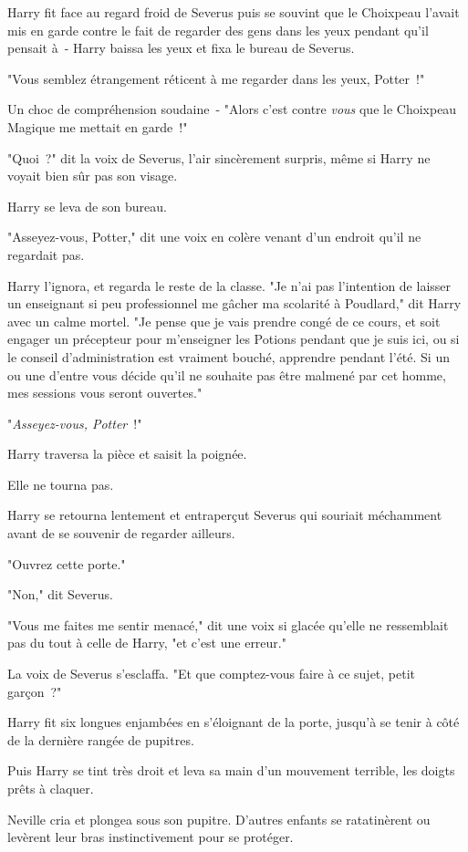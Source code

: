 Harry fit face au regard froid de Severus puis se souvint que le Choixpeau l'avait mis en garde contre le fait de regarder des gens dans les yeux pendant qu'il pensait à~- Harry baissa les yeux et fixa le bureau de Severus.

"Vous semblez étrangement réticent à me regarder dans les yeux, Potter~!"

Un choc de compréhension soudaine~- "Alors c'est contre \emph{vous} que le Choixpeau Magique me mettait en garde~!"

"Quoi~?" dit la voix de Severus, l'air sincèrement surpris, même si Harry ne voyait bien sûr pas son visage.

Harry se leva de son bureau.

"Asseyez-vous, Potter," dit une voix en colère venant d'un endroit qu'il ne regardait pas.

Harry l'ignora, et regarda le reste de la classe. "Je n'ai pas l'intention de laisser un enseignant si peu professionnel me gâcher ma scolarité à Poudlard," dit Harry avec un calme mortel. "Je pense que je vais prendre congé de ce cours, et soit engager un précepteur pour m'enseigner les Potions pendant que je suis ici, ou si le conseil d'administration est vraiment bouché, apprendre pendant l'été. Si un ou une d'entre vous décide qu'il ne souhaite pas être malmené par cet homme, mes sessions vous seront ouvertes."

"\emph{Asseyez-vous, Potter}~!"

Harry traversa la pièce et saisit la poignée.

Elle ne tourna pas.

Harry se retourna lentement et entraperçut Severus qui souriait méchamment avant de se souvenir de regarder ailleurs.

"Ouvrez cette porte."

"Non," dit Severus.

"Vous me faites me sentir menacé," dit une voix si glacée qu'elle ne ressemblait pas du tout à celle de Harry, "et c'est une erreur."

La voix de Severus s'esclaffa. "Et que comptez-vous faire à ce sujet, petit garçon~?"

Harry fit six longues enjambées en s'éloignant de la porte, jusqu'à se tenir à côté de la dernière rangée de pupitres.

Puis Harry se tint très droit et leva sa main d'un mouvement terrible, les doigts prêts à claquer.

Neville cria et plongea sous son pupitre. D'autres enfants se ratatinèrent ou levèrent leur bras instinctivement pour se protéger.


